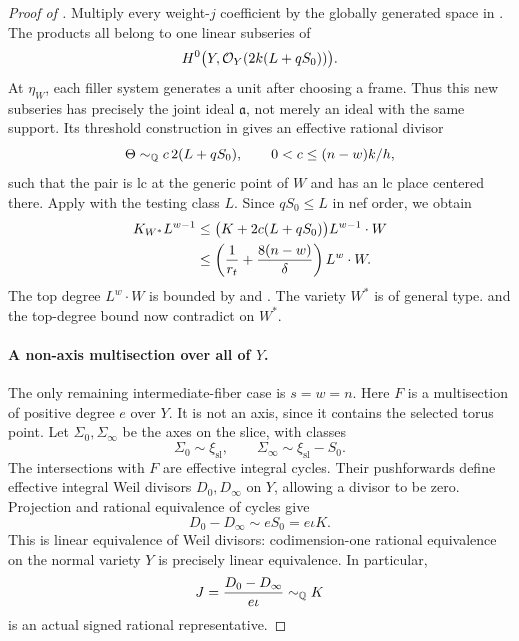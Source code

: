 \begin{proof}[Proof of ]
Multiply every weight-\(j\) coefficient by the globally generated
space in . The products all belong to one
linear subseries of
\[
 H^0\bigl(Y,\mathcal O_Y(2k(L+qS_0))\bigr).
\]
At \(\eta_W\), each filler system generates a unit after choosing a
frame. Thus this new subseries has precisely the joint ideal
\(\mathfrak a\), not merely an ideal with the same support. Its
threshold construction in  gives an
effective rational divisor
\[
 \Theta\sim_{\mathbb Q}c\,2(L+qS_0),\qquad
 0<c\le(n-w)k/h,
\]
such that the pair is lc at the generic point of \(W\) and has
an lc place centered there. Apply
 with the testing class \(L\).
Since \(qS_0\le L\) in nef order, we obtain
\begin{align}
 K_{W^*}L^{w-1}
 &\le\bigl(K+2c(L+qS_0)\bigr)L^{w-1}\cdot W \notag\\
 &\le\left(\frac1{r_t}+\frac{8(n-w)}{\delta}\right)L^w\cdot W .
 \label{eq:whole-bundle-canonical}
\end{align}
The top degree \(L^w\cdot W\) is bounded by
 and
. The variety \(W^*\) is of general
type.  and the top-degree
bound now contradict  on \(W^*\).

\paragraph{A non-axis multisection over all of \(Y\).}
The only remaining intermediate-fiber case is \(s=w=n\).
Here \(F\) is a multisection of positive degree \(e\) over \(Y\).
It is not an axis, since it contains the selected torus point.
Let \(\Sigma_0,\Sigma_\infty\) be the axes on the slice, with
classes
\[
 \Sigma_0\sim\xi_{\mathrm{sl}},\qquad
 \Sigma_\infty\sim\xi_{\mathrm{sl}}-S_0.
\]
The intersections with \(F\) are effective integral cycles. Their
pushforwards define effective integral Weil divisors \(D_0,D_\infty\)
on \(Y\), allowing a divisor to be zero. Projection and rational
equivalence of cycles give
\begin{equation}\label{eq:axis-linear-equivalence}
 D_0-D_\infty\sim eS_0=e\iota K .
\end{equation}
This is linear equivalence of Weil divisors: codimension-one
rational equivalence on the normal variety \(Y\) is precisely
linear equivalence. In particular,
\[
 J=\frac{D_0-D_\infty}{e\iota}\sim_{\mathbb Q}K
\]
is an actual signed rational representative.


\end{proof}
